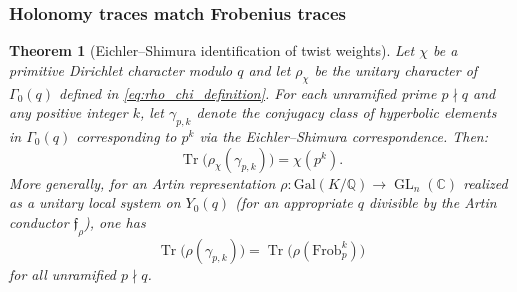 \documentclass[11pt,oneside]{amsbook}
\numberwithin{equation}{section}
\theoremstyle{plain}
\newtheorem{theorem}{Theorem}[section]
\theoremstyle{definition}
\theoremstyle{remark}
\newcommand{\Q}{\mathbb{Q}}
\newcommand{\C}{\mathbb{C}}
\DeclareMathOperator{\Tr}{\mathrm{Tr}}
\DeclareMathOperator{\GL}{\mathrm{GL}}
\begin{document}
\subsubsection{Holonomy traces match Frobenius traces}

\begin{theorem}[Eichler--Shimura identification of twist weights]
\label{thm:eichler_shimura_weights}
Let $\chi$ be a primitive Dirichlet character modulo $q$ and let $\rho_\chi$ be the unitary character of $\Gamma_0(q)$ defined in \eqref{eq:rho_chi_definition}.
For each unramified prime $p\nmid q$ and any positive integer $k$, let $\gamma_{p,k}$ denote the conjugacy class of hyperbolic elements in $\Gamma_0(q)$ corresponding to $p^k$ via the Eichler--Shimura correspondence.
Then:
\begin{equation}
\label{eq:eichler_shimura_weight_match}
\Tr\!\bigl(\rho_\chi(\gamma_{p,k})\bigr) = \chi(p^k).
\end{equation}
More generally, for an Artin representation $\rho:\mathrm{Gal}(K/\Q)\to\GL_n(\C)$ realized as a unitary local system on $Y_0(q)$ (for an appropriate $q$ divisible by the Artin conductor $\mathfrak{f}_\rho$), one has
\begin{equation}
\label{eq:artin_weight_match}
\Tr\!\bigl(\rho(\gamma_{p,k})\bigr) = \Tr\!\bigl(\rho(\mathrm{Frob}_p^k)\bigr)
\end{equation}
for all unramified $p\nmid q$.
\end{theorem}
\end{document}
